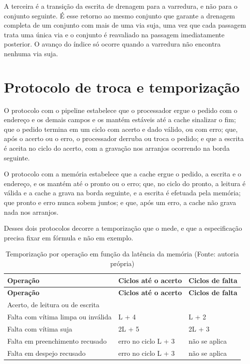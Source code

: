 A terceira é a transição da escrita de drenagem para a varredura, e não para o conjunto seguinte. É esse retorno ao mesmo conjunto que garante a drenagem completa de um conjunto com mais de uma via suja, uma vez que cada passagem trata uma única via e o conjunto é reavaliado na passagem imediatamente posterior. O avanço do índice só ocorre quando a varredura não encontra nenhuma via suja.

\section{Protocolo de troca e temporização}\label{sec:4.7}

O protocolo com o pipeline estabelece que o processador ergue o pedido com o endereço e os demais campos e os mantém estáveis até a cache sinalizar o fim; que o pedido termina em um ciclo com acerto e dado válido, ou com erro; que, após o acerto ou o erro, o processador derruba ou troca o pedido; e que a escrita é aceita no ciclo do acerto, com a gravação nos arranjos ocorrendo na borda seguinte.

O protocolo com a memória estabelece que a cache ergue o pedido, a escrita e o endereço, e os mantém até o pronto ou o erro; que, no ciclo do pronto, a leitura é válida e a cache a grava na borda seguinte, e a escrita é efetuada pela memória; que pronto e erro nunca sobem juntos; e que, após um erro, a cache não grava nada nos arranjos.

Desses dois protocolos decorre a temporização que o  mede, e que a especificação precisa fixar em fórmula e não em exemplo.

{\small
\begin{longtable}{@{}>{\raggedright\arraybackslash}p{}>{\raggedright\arraybackslash}p{}>{\raggedright\arraybackslash}p{}@{}}
\caption[Temporização por operação em função da latência da memória]{Temporização por operação em função da latência da memória (Fonte: autoria própria)}\label{tab:4.8}\\
\hline
\textbf{Operação} & \textbf{Ciclos até o acerto} & \textbf{Ciclos de falta} \\
\hline
\endfirsthead
\hline
\textbf{Operação} & \textbf{Ciclos até o acerto} & \textbf{Ciclos de falta} \\
\hline
\endhead
\hline
\endlastfoot
Acerto, de leitura ou de escrita & 2 & 0 \\
Falta com vítima limpa ou inválida & L + 4 & L + 2 \\
Falta com vítima suja & 2L + 5 & 2L + 3 \\
Falta em preenchimento recusado & erro no ciclo L + 3 & não se aplica \\
Falta em despejo recusado & erro no ciclo L + 3 & não se aplica \\
\end{longtable}
}

